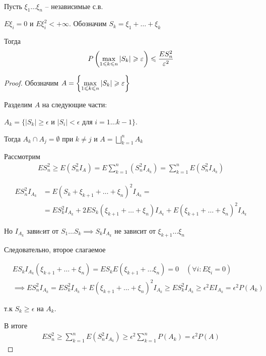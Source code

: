 
\begin{lemma}~

  Пусть $\xi_1 \ldots \xi_n$ -- независимые с.в.

  $E \xi_i = 0$ и $E \xi_i^2 < +\infty$. 
  Обозначим $S_k = \xi_1 + \ldots + \xi_k$

  Тогда
  \begin{align*}
    P\left( \max_{1 \leqslant k \leqslant n}|S_k| \geqslant \varepsilon \right) \leqslant \frac{E S_n^2}{ \varepsilon^2}
  \end{align*}
\end{lemma}

\begin{proof}
  Обозначим $A = \left\{ \max\limits_{1 \leqslant k \leqslant n}{|S_k|} \geqslant \varepsilon  \right\}$
    
  Разделим $A$ на следующие части:

  $A_k = \{|S_k| \geq \epsilon $ и $|S_i| < \epsilon$ для $i = 1 \ldots k - 1\}$.

  Тогда $A_k \cap A_j = \emptyset$ при $k \neq j$ и $A = \bigsqcup\limits_{k = 1}^{n} A_k$

  Рассмотрим 
  \begin{align*}
    E S_n^2 \geq E(S_n^2 I_A) = E \sum_{k = 1}^{n} (S_n^2 I_{A_k}) = \sum_{k = 1}^n E(S_n^2 I_{A_k})
  \end{align*}

  \begin{align*}
    E S_n^2 I_{A_k} &= E(S_k + \xi_{k + 1} + \ldots + \xi_n)^2 I_{A_k} =\\
    &= E S_k^2 I_{A_k} + 2 E S_k (\xi_{k + 1} + \ldots + \xi_n) I_{A_k} + 
    E(\xi_{k + 1} + \ldots + \xi_n)^2 I_{A_k}
  \end{align*}

  Но $I_{A_k}$ завиcит от $S_1 \ldots S_k \implies S_k I_{A_k}$ 
  не зависит от $\xi_{k + 1} \ldots \xi_n$

  Следовательно, второе слагаемое

  \begin{align*}
    &E S_k I_{A_k} (\xi_{k + 1} + \ldots + \xi_n) = 
    E S_k E(\xi_{k + 1} + \ldots \xi_n) = 0 \quad (\forall i: E \xi_i = 0)\\
    &\implies E S_n^2 I_{A_k} = E S_k^2 I_{A_k} + E(\xi_{k + 1} + \ldots + \xi_n)^2 I_{A_k} 
    \geq E S_k^2 I_{A_k} \geq \epsilon^ 2 E I_{A_k} = \epsilon^2 P(A_k)
  \end{align*}

  т.к $S_k \geq \epsilon$ на $A_k$.

  В итоге
  \begin{align*}
    E S_n^2 \geq \sum_{k = 1}^{n} E (S_n^2 I_{A_k}) \geq 
    \epsilon^2 \sum_{k = 1}^{n} P(A_k) = \epsilon^2 P(A)
  \end{align*}
\end{proof}

